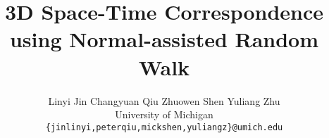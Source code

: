 \documentclass[final]{cvpr}
\begin{document}
\title{3D Space-Time Correspondence using Normal-assisted Random Walk}


\author{
Linyi Jin \kern15pt Changyuan Qiu \kern15pt Zhuowen Shen \kern15pt Yuliang Zhu \\
   University of Michigan\\
	{\tt\small \{jinlinyi,peterqiu,mickshen,yuliangz\}@umich.edu}\\
}



\maketitle


\end{document}
